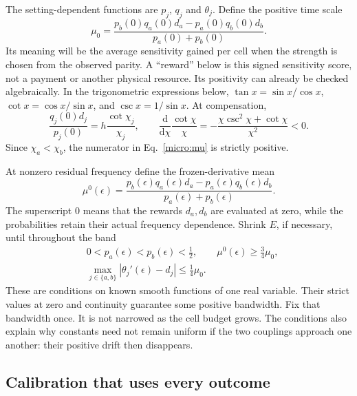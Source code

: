 \documentclass[11pt,a4paper]{article}
\numberwithin{equation}{section}
\theoremstyle{remark}
\newcommand{\dd}{\mathrm d}
\begin{document}
The setting-dependent functions are $p_j$, $q_j$ and $\theta_j$. Define the positive time scale
\begin{equation}
 \mu_0=
 \frac{p_b(0)q_a(0)d_a-p_a(0)q_b(0)d_b}{p_a(0)+p_b(0)}.
 \label{micro:mu}
\end{equation}
Its meaning will be the average sensitivity gained per cell when the
strength is chosen from the observed parity. A ``reward'' below is this
signed sensitivity score, not a payment or another physical resource.
Its positivity can already be
checked algebraically. In the trigonometric expressions below,
$\tan x=\sin x/\cos x$, $\cot x=\cos x/\sin x$, and $\csc x=1/\sin x$.
At compensation,
\begin{equation}
 \frac{q_j(0)d_j}{p_j(0)}=h\frac{\cot\chi_j}{\chi_j},
 \qquad
 \frac{\dd}{\dd\chi}\frac{\cot\chi}{\chi}
 =-\frac{\chi\csc^2\chi+\cot\chi}{\chi^2}<0.
 \label{micro:driftpositive}
\end{equation}
Since $\chi_a<\chi_b$, the numerator in Eq.~\eqref{micro:mu} is
strictly positive.

At nonzero residual frequency define the frozen-derivative mean
\begin{equation}
 \mu^0(\epsilon)=
 \frac{p_b(\epsilon)q_a(\epsilon)d_a
              -p_a(\epsilon)q_b(\epsilon)d_b}
      {p_a(\epsilon)+p_b(\epsilon)}.
\end{equation}
The superscript $0$ means that the rewards $d_a,d_b$ are evaluated at
zero, while the probabilities retain their actual frequency dependence.
Shrink $E$, if necessary, until throughout the band
\begin{align}
 &0<p_a(\epsilon)<p_b(\epsilon)<\tfrac12,
 \qquad \mu^0(\epsilon)\ge\tfrac34\mu_0,
 \label{micro:band2}\\
 &\max_{j\in\{a,b\}}|\theta_j'(\epsilon)-d_j|
                         \le\tfrac14\mu_0.
 \label{micro:band3}
\end{align}
These are conditions on known smooth functions of one real variable.
Their strict values at zero and continuity guarantee some positive
bandwidth. Fix that bandwidth once. It is not narrowed as the cell
budget grows. The conditions also explain why constants need not remain
uniform if the two couplings approach one another: their positive drift
then disappears.

\subsection{Calibration that uses every outcome}
\label{micro:calibration}
\end{document}
